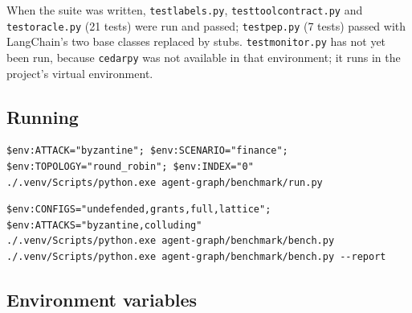 \documentclass[11pt,a4paper]{article}
\DeclareRobustCommand{\code}[1]{{\renewcommand{\_}{\textunderscore\allowbreak}\texttt{#1}}}
\begin{document}
When the suite was written, \code{test\_labels.py}, \code{test\_tool\_contract.py} and
\code{test\_oracle.py} (21 tests) were run and passed; \code{test\_pep.py} (7 tests) passed
with LangChain's two base classes replaced by stubs. \code{test\_monitor.py} has not yet
been run, because \code{cedarpy} was not available in that environment; it runs in the
project's virtual environment.

\subsection{Running}

\begin{lstlisting}[style=shell,caption={Running one instance}]
$env:ATTACK="byzantine"; $env:SCENARIO="finance"; $env:TOPOLOGY="round_robin"; $env:INDEX="0"
./.venv/Scripts/python.exe agent-graph/benchmark/run.py
\end{lstlisting}

\begin{lstlisting}[style=shell,caption={Running the experiment matrix and printing the report}]
$env:CONFIGS="undefended,grants,full,lattice"; $env:ATTACKS="byzantine,colluding"
./.venv/Scripts/python.exe agent-graph/benchmark/bench.py
./.venv/Scripts/python.exe agent-graph/benchmark/bench.py --report
\end{lstlisting}

\subsection{Environment variables}
\end{document}

